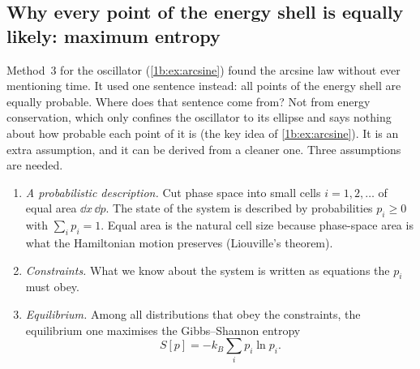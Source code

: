 \subsection{Why every point of the energy shell is equally likely: maximum entropy}
\label{1b:sec:maxent}

Method~3 for the oscillator (\cref{1b:ex:arcsine}) found the arcsine law without
ever mentioning time. It used one sentence instead: all points of the energy shell
are equally probable. Where does that sentence come from? Not from energy
conservation, which only confines the oscillator to its ellipse and says nothing
about how probable each point of it is (the key idea of \cref{1b:ex:arcsine}). It is
an extra assumption, and it can be derived from a cleaner one. Three
assumptions are needed.
\begin{enumerate}[leftmargin=1.6em,itemsep=1pt]
  \item \emph{A probabilistic description.} Cut phase space into small cells
        $i=1,2,\dots$ of equal area $\dd x\,\dd p$. The state of the system is
        described by probabilities $p_i\ge0$ with $\sum_ip_i=1$. Equal area is the
        natural cell size because phase-space area is what the Hamiltonian motion
        preserves (Liouville's theorem).
  \item \emph{Constraints.} What we know about the system is written as equations
        the $p_i$ must obey.
  \item \emph{Equilibrium.} Among all distributions that obey the constraints, the
        equilibrium one maximises the Gibbs--Shannon entropy
        \begin{equation}
          S[p]=-k_B\sum_ip_i\ln p_i .
          \label{1b:eq:gibbs-entropy}
        \end{equation}
\end{enumerate}

